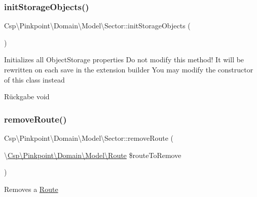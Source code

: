 \subsubsection{\texorpdfstring{init\+Storage\+Objects()}{initStorageObjects()}}
{\footnotesize\ttfamily Csp\textbackslash{}\+Pinkpoint\textbackslash{}\+Domain\textbackslash{}\+Model\textbackslash{}\+Sector\+::init\+Storage\+Objects (\begin{DoxyParamCaption}{ }\end{DoxyParamCaption})\hspace{0.3cm}{\ttfamily [protected]}}

Initializes all Object\+Storage properties Do not modify this method! It will be rewritten on each save in the extension builder You may modify the constructor of this class instead

\begin{DoxyReturn}{Rückgabe}
void 
\end{DoxyReturn}
\mbox{\label{classCsp_1_1Pinkpoint_1_1Domain_1_1Model_1_1Sector_abda5c3d25e77ab7c8baa0a653f546db4}} 
\subsubsection{\texorpdfstring{remove\+Route()}{removeRoute()}}
{\footnotesize\ttfamily Csp\textbackslash{}\+Pinkpoint\textbackslash{}\+Domain\textbackslash{}\+Model\textbackslash{}\+Sector\+::remove\+Route (\begin{DoxyParamCaption}\item[{\textbackslash{}\hyperlink{classCsp_1_1Pinkpoint_1_1Domain_1_1Model_1_1Route}{Csp\textbackslash{}\+Pinkpoint\textbackslash{}\+Domain\textbackslash{}\+Model\textbackslash{}\+Route}}]{\$route\+To\+Remove }\end{DoxyParamCaption})}

Removes a \hyperlink{classCsp_1_1Pinkpoint_1_1Domain_1_1Model_1_1Route}{Route}


